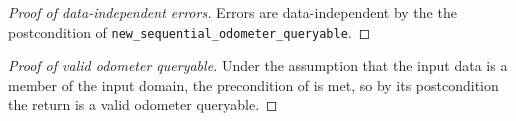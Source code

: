 \documentclass{article}
\begin{document}
\begin{proof}[Proof of data-independent errors] 
    Errors are data-independent by the the postcondition of \texttt{new\_sequential\_odometer\_queryable}.
\end{proof}

\begin{proof}[Proof of valid odometer queryable]
    Under the assumption that the input data is a member of the input domain,
    the precondition of  is met,
    so by its postcondition the return is a valid odometer queryable.
\end{proof}
\end{document}
